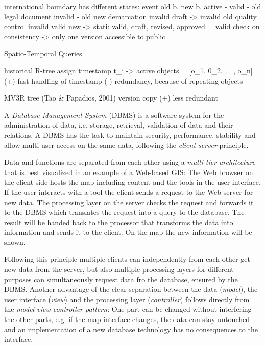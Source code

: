   international boundary has different states:
    event           old b.    new b.              active
    -               valid     -                   old
    legal document  invalid   -                   old
    new demarcation invalid   draft -> invalid    old
    quality control invalid   valid               new
  -> stati: valid, draft, revised, approved = valid
  check on consistency -> only one version accessible to public

Spatio-Temporal Queries


historical R-tree
  assign timestamp t\_i -> active objects = [o\_1, 0\_2, ... , o\_n]
  (+) fast handling of timestamp
  (-) redundancy, because of repeating objects

MV3R tree (Tao \& Papadios, 2001)
  version copy
  (+) less redundant


A \emph{Database Management System} (DBMS) is a software system for the administration of data, i.e. storage, retrieval, validation of data and their relations. A DBMS has the task to maintain security, performance, stability and allow multi-user access on the same data, following the \emph{client-server} principle.

Data and functions are separated from each other using a \emph{multi-tier architecture} that is best visualized in an example of a Web-based GIS:
The Web browser on the client side hosts the map including content and the tools in the user interface. If the user interacts with a tool the client sends a request to the Web server for new data. The processing layer on the server checks the request and forwards it to the DBMS which translates the request into a query to the database. The result will be handed back to the processor that transforms the data into information and sends it to the client. On the map the new information will be shown.

Following this principle multiple clients can independently from each other get new data from the server, but also multiple processing layers for different purposes can simultaneously request data fro the database, ensured by the DBMS. Another advantage of the clear separation between the data (\emph{model}), the user interface (\emph{view}) and the processing layer (\emph{controller}) follows directly from the \emph{model-view-controller pattern}: One part can be changed without interfering the other parts, e.g. if the map interface changes, the data can stay untouched and an implementation of a new database technology has no consequences to the interface.

